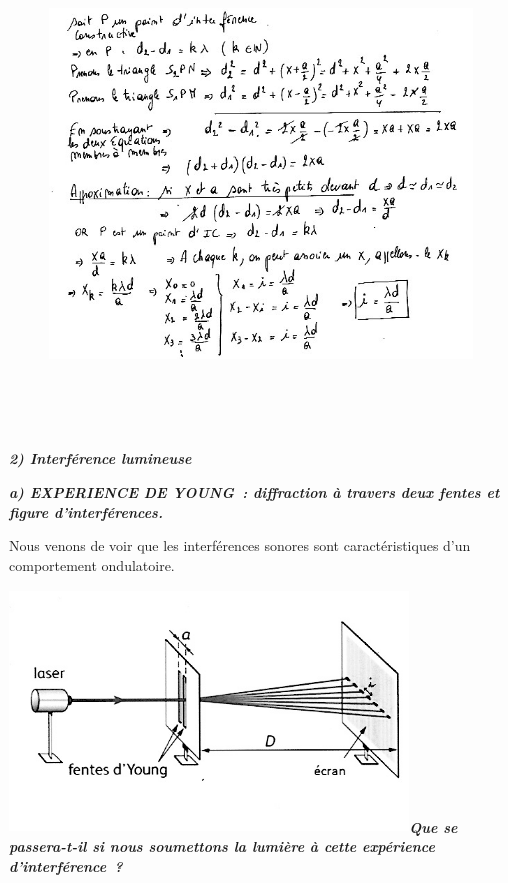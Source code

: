 \begin{figure}
\centering
\includegraphics[width=17.253cm,height=13.09cm]{Pictures/100000010000025F000001F704069EFE234008BD.png}
\caption{}
\end{figure}

\emph{\textbf{2) Interférence lumineuse }}

\emph{\textbf{a) EXPERIENCE DE YOUNG~: diffraction à travers deux fentes
et figure d'interférences. }}

Nous venons de voir que les interférences sonores sont caractéristiques
d'un comportement ondulatoire.

\includegraphics[width=10.592cm,height=6.443cm]{Pictures/100000010000025A000001696E99605075C8F3D0.png}\emph{\textbf{Que
se passera-t-il si nous soumettons la lumière à cette expérience
d'interférence~? }}

